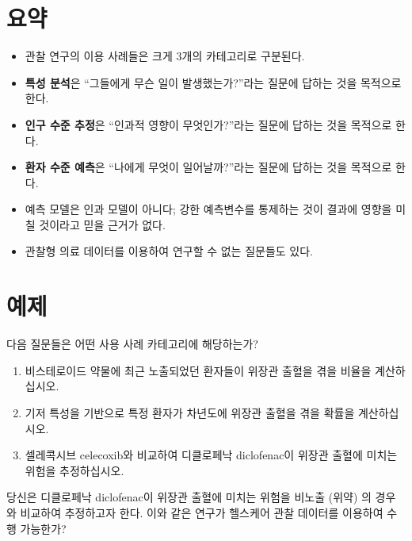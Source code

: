 \documentclass[11pt]{book}
\theoremstyle{definition}
\theoremstyle{definition}
\theoremstyle{definition}
\theoremstyle{remark}
\let\BeginKnitrBlock\begin \let\EndKnitrBlock\end
\begin{document}
\section{요약}\label{-5}

\BeginKnitrBlock{rmdsummary}
\begin{itemize}
\item
  관찰 연구의 이용 사례들은 크게 3개의 카테고리로 구분된다.
\item
  \textbf{특성 분석}은 ``그들에게 무슨 일이 발생했는가?''라는 질문에
  답하는 것을 목적으로 한다.
\item
  \textbf{인구 수준 추정}은 ``인과적 영향이 무엇인가?''라는 질문에
  답하는 것을 목적으로 한다.
\item
  \textbf{환자 수준 예측}은 ``나에게 무엇이 일어날까?''라는 질문에
  답하는 것을 목적으로 한다.
\item
  예측 모델은 인과 모델이 아니다; 강한 예측변수를 통제하는 것이 결과에
  영향을 미칠 것이라고 믿을 근거가 없다.
\item
  관찰형 의료 데이터를 이용하여 연구할 수 없는 질문들도 있다.
\end{itemize}
\EndKnitrBlock{rmdsummary}

\section{예제}\label{-3}

\BeginKnitrBlock{exercise}
\protect\hypertarget{exr:exerciseUseCases1}{}{\label{exr:exerciseUseCases1}
}다음 질문들은 어떤 사용 사례 카테고리에 해당하는가?

\begin{enumerate}
\def\labelenumi{\arabic{enumi}.}
\item
  비스테로이드 약물에 최근 노출되었던 환자들이 위장관 출혈을 겪을 비율을
  계산하십시오.
\item
  기저 특성을 기반으로 특정 환자가 차년도에 위장관 출혈을 겪을 확률을
  계산하십시오.
\item
  셀레콕시브 celecoxib와 비교하여 디클로페낙 diclofenac이 위장관 출혈에
  미치는 위험을 추정하십시오.
\end{enumerate}
\EndKnitrBlock{exercise}

\BeginKnitrBlock{exercise}
\protect\hypertarget{exr:exerciseUseCases2}{}{\label{exr:exerciseUseCases2}
}당신은 디클로페낙 diclofenac이 위장관 출혈에 미치는 위험을 비노출
(위약) 의 경우와 비교하여 추정하고자 한다. 이와 같은 연구가 헬스케어
관찰 데이터를 이용하여 수행 가능한가?
\EndKnitrBlock{exercise}
\end{document}
